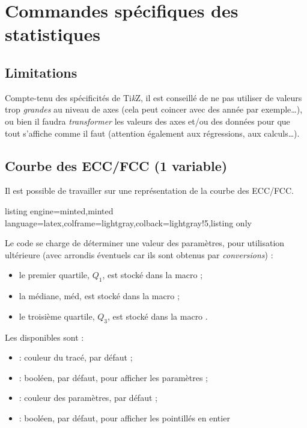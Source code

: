 \documentclass[11pt,a4paper]{ltxdoc}
\providecommand\tikzlogo{Ti\textit{k}Z}
\let\TikZ\tikzlogo
\begin{document}
\pagebreak

\section{Commandes spécifiques des statistiques}

\subsection{Limitations}

Compte-tenu des spécificités de \TikZ, il est conseillé de ne pas utiliser de valeurs trop \textit{grandes} au niveau de axes (cela peut coincer avec des année par exemple\ldots), ou bien il faudra \textit{transformer} les valeurs des axes et/ou des données pour que tout s'affiche comme il faut (attention également aux régressions, aux calculs\ldots).

\subsection{Courbe des ECC/FCC (1 variable)}\label{cbeECC}

Il est possible de travailler sur une représentation de la courbe des ECC/FCC.

\begin{tcblisting}{listing engine=minted,minted language=latex,colframe=lightgray,colback=lightgray!5,listing only}
\end{tcblisting}

Le code se charge de déterminer une valeur des paramètres, pour utilisation ultérieure (avec arrondis éventuels car ils sont obtenus par \textit{conversions}) :

\begin{itemize}
  \item le premier quartile, $Q_1$, est stocké dans la macro  ;
  \item la médiane, méd, est stocké dans la macro  ;
  \item le troisième quartile, $Q_3$, est stocké dans la macro .
\end{itemize}

Les  disponibles sont :

\begin{itemize}
  \item {} : couleur du tracé,  par défaut ;
  \item {} : booléen,  par défaut, pour afficher les paramètres ;
  \item {} : couleur des paramètres,  par défaut ;
  \item {} : booléen,  par défaut, pour afficher les pointillés en entier
\end{itemize}
\end{document}
